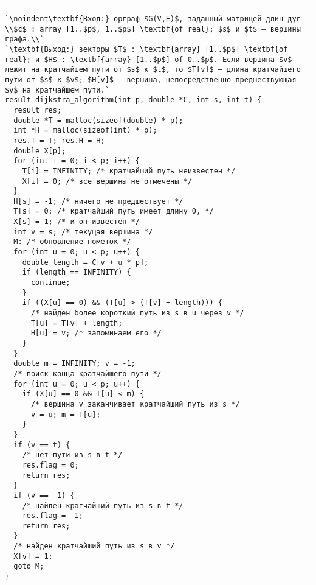 \documentclass[11pt,b5paper,twoside,openany]{book}
\begin{document}
\vspace{5pt} \hrule
\begin{lstlisting}[caption={Алгоритм Дейкстры}, label=p286_dijkstra_1, escapechar=`]
`\noindent\textbf{Вход:} орграф $G(V,E)$, заданный матрицей длин дуг \\$c$ : array [1..$p$, 1..$p$] \textbf{of real}; $s$ и $t$ — вершины графа.\\`
`\textbf{Выход:} векторы $T$ : \textbf{array} [1..$p$] \textbf{of real}; и $H$ : \textbf{array} [1..$p$] of 0..$p$. Если вершина $v$ лежит на кратчайшем пути от $s$ к $t$, то $T[v]$ — длина кратчайшего пути от $s$ к $v$; $H[v]$ — вершина, непосредственно предшествующая $v$ на кратчайшем пути.`
result dijkstra_algorithm(int p, double *C, int s, int t) {
  result res;
  double *T = malloc(sizeof(double) * p);
  int *H = malloc(sizeof(int) * p);
  res.T = T; res.H = H;
  double X[p];
  for (int i = 0; i < p; i++) {
    T[i] = INFINITY; /* кратчайший путь неизвестен */
    X[i] = 0; /* все вершины не отмечены */
  }
  H[s] = -1; /* ничего не предшествует */
  T[s] = 0; /* кратчайший путь имеет длину 0, */
  X[s] = 1; /* и он известен */
  int v = s; /* текущая вершина */
  M: /* обновление пометок */
  for (int u = 0; u < p; u++) {
    double length = C[v + u * p];
    if (length == INFINITY) {
      continue;
    }
    if ((X[u] == 0) && (T[u] > (T[v] + length))) {
      /* найден более короткий путь из s в u через v */
      T[u] = T[v] + length;
      H[u] = v; /* запоминаем его */
    }
  }
  double m = INFINITY; v = -1;
  /* поиск конца кратчайшего пути */
  for (int u = 0; u < p; u++) {
    if (X[u] == 0 && T[u] < m) {
      /* вершина v заканчивает кратчайший путь из s */
      v = u; m = T[u];
    }
  }
  if (v == t) {
    /* нет пути из s в t */
    res.flag = 0;
    return res;
  }
  if (v == -1) {
    /* найден кратчайший путь из s в t */
    res.flag = -1;
    return res;
  }
  /* найден кратчайший путь из s в v */
  X[v] = 1;
  goto M;
}
\end{lstlisting}
\end{document}
